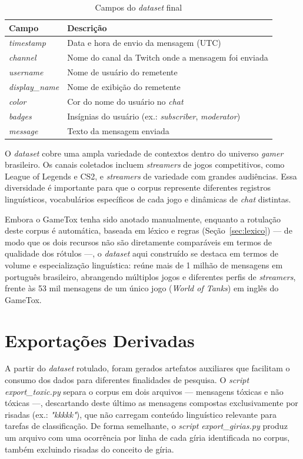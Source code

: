 \documentclass{eic-bcc-tcc}
\begin{document}
\begin{table}[h!]
\centering
\small
\begin{tabular}{ll}
\hline
\textbf{Campo} & \textbf{Descrição} \\ \hline
\textit{timestamp}     & Data e hora de envio da mensagem (UTC) \\
\textit{channel}       & Nome do canal da Twitch onde a mensagem foi enviada \\
\textit{username}      & Nome de usuário do remetente \\
\textit{display\_name} & Nome de exibição do remetente \\
\textit{color}         & Cor do nome do usuário no \textit{chat} \\
\textit{badges}        & Insígnias do usuário (ex.: \textit{subscriber}, \textit{moderator}) \\
\textit{message}       & Texto da mensagem enviada \\ \hline
\end{tabular}
\caption{Campos do \textit{dataset} final}
\label{tab:colunas}
\end{table}

O \textit{dataset} cobre uma ampla variedade de contextos dentro do universo \textit{gamer} brasileiro. Os canais coletados incluem \textit{streamers} de jogos competitivos, como League of Legends e CS2, e \textit{streamers} de variedade com grandes audiências. Essa diversidade é importante para que o corpus represente diferentes registros linguísticos, vocabulários específicos de cada jogo e dinâmicas de \textit{chat} distintas.

Embora o GameTox \cite{naseem-etal-2025-gametox} tenha sido anotado manualmente, enquanto a rotulação deste corpus é automática, baseada em léxico e regras (Seção~\ref{sec:lexico}) — de modo que os dois recursos não são diretamente comparáveis em termos de qualidade dos rótulos —, o \textit{dataset} aqui construído se destaca em termos de volume e especialização linguística: reúne mais de 1 milhão de mensagens em português brasileiro, abrangendo múltiplos jogos e diferentes perfis de \textit{streamers}, frente às 53 mil mensagens de um único jogo (\textit{World of Tanks}) em inglês do GameTox.

\section{Exportações Derivadas}
\label{sec:exportacoes}

A partir do \textit{dataset} rotulado, foram gerados artefatos auxiliares que facilitam o consumo dos dados para diferentes finalidades de pesquisa. O \textit{script} \textit{export\_toxic.py} separa o corpus em dois arquivos — mensagens tóxicas e não tóxicas —, descartando deste último as mensagens compostas exclusivamente por risadas (ex.: \textit{"kkkkk"}), que não carregam conteúdo linguístico relevante para tarefas de classificação. De forma semelhante, o \textit{script} \textit{export\_girias.py} produz um arquivo com uma ocorrência por linha de cada gíria identificada no corpus, também excluindo risadas do conceito de gíria.
\end{document}
